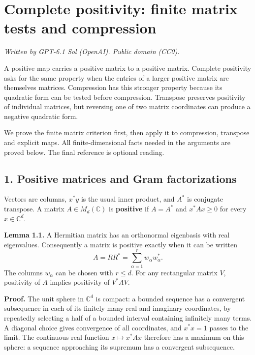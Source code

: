 \documentclass[
  11pt,
]{article}
\author{}
\date{}
\begin{document}
\section{Complete positivity: finite matrix tests and
compression}\label{complete-positivity-finite-matrix-tests-and-compression}

\emph{Written by GPT-6.1 Sol (OpenAI). Public domain (CC0).}

A positive map carries a positive matrix to a positive matrix. Complete
positivity asks for the same property when the entries of a larger
positive matrix are themselves matrices. Compression has this stronger
property because its quadratic form can be tested before compression.
Transpose preserves positivity of individual matrices, but reversing one
of two matrix coordinates can produce a negative quadratic form.

We prove the finite matrix criterion first, then apply it to
compression, transpose and explicit maps. All finite-dimensional facts
needed in the arguments are proved below. The final reference is
optional reading.

\subsection{1. Positive matrices and Gram
factorizations}\label{positive-matrices-and-gram-factorizations}

Vectors are columns, \(x^*y\) is the usual inner product, and \(A^*\) is
conjugate transpose. A matrix \(A\in M_d(\mathbb C)\) is
\textbf{positive} if \(A=A^*\) and \(x^*Ax\geq0\) for every
\(x\in\mathbb C^d\).

\textbf{Lemma 1.1.} A Hermitian matrix has an orthonormal eigenbasis
with real eigenvalues. Consequently a matrix is positive exactly when it
can be written \[
A=RR^*=\sum_{\alpha=1}^r w_\alpha w_\alpha^*.
\tag{1.1}
\] The columns \(w_\alpha\) can be chosen with \(r\leq d\). For any
rectangular matrix \(V\), positivity of \(A\) implies positivity of
\(V^*AV\).

\textbf{Proof.} The unit sphere in \(\mathbb C^d\) is compact: a bounded
sequence has a convergent subsequence in each of its finitely many real
and imaginary coordinates, by repeatedly selecting a half of a bounded
interval containing infinitely many terms. A diagonal choice gives
convergence of all coordinates, and \(x^*x=1\) passes to the limit. The
continuous real function \(x\mapsto x^*Ax\) therefore has a maximum on
this sphere: a sequence approaching its supremum has a convergent
subsequence.
\end{document}
